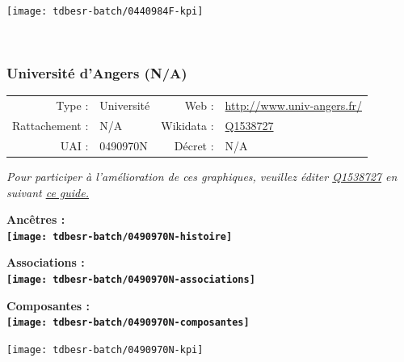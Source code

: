 \documentclass[12pt,french,]{article}
\begin{document}
\begin{center}\texttt{[image: tdbesr-batch/0440984F-kpi]} \end{center}\checkoddpage

\ifoddpage \fi ~\newpage  

\hypertarget{universituxe9-dangers-na}{%
\subsubsection{Université d'Angers
(N/A)}\label{universituxe9-dangers-na}}

\begin{tabular*}{\textwidth}{rp{5cm}rl}  
\hline  
Type : & Université & Web : &\href{http://www.univ-angers.fr/}{http://www.univ-angers.fr/} \\  
Rattachement : & N/A & Wikidata : & \href{https://www.wikidata.org/entity/Q1538727}{Q1538727} \\  
UAI : & 0490970N & Décret : & N/A \\  
\hline  
\end{tabular*}

\textit{\scriptsize Pour participer à l'amélioration de ces graphiques, veuillez éditer  \href{https://www.wikidata.org/entity/Q1538727}{Q1538727}  en suivant \href{https://github.com/cpesr/wikidataESR/blob/master/Rmd/wikidataESR.md}{ce guide.}}

\vspace{1cm}  
\begin{minipage}[b]{0.50\textwidth}\begin{center} \bf Ancêtres : \\  
\texttt{[image: tdbesr-batch/0490970N-histoire]} \end{center}\end{minipage}\begin{minipage}[b]{0.50\textwidth}\begin{center} \bf Associations : \\  
\texttt{[image: tdbesr-batch/0490970N-associations]} \end{center}\end{minipage}

\hrulefill

\begin{center} \bf Composantes : \\  
\texttt{[image: tdbesr-batch/0490970N-composantes]} \end{center}

\begin{center}\texttt{[image: tdbesr-batch/0490970N-kpi]} \end{center}\checkoddpage
\end{document}
